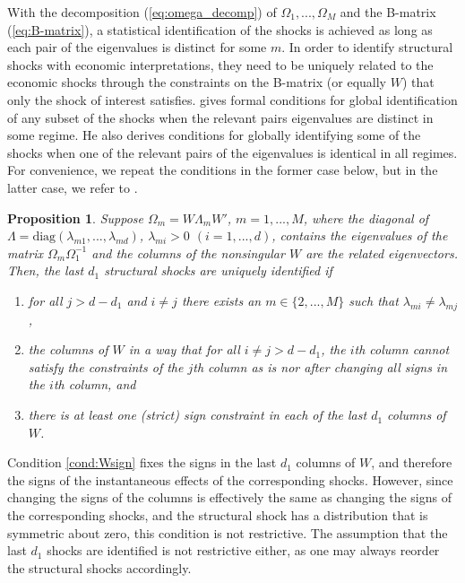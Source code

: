 \documentclass[nojss]{jss}
\newtheorem{proposition}{Proposition}
\begin{document}
With the decomposition (\ref{eq:omega_decomp}) of $\Omega_1,...,\Omega_M$ and the B-matrix (\ref{eq:B-matrix}),  a statistical identification of the shocks is achieved as long as each pair of the eigenvalues is distinct for some $m$.  In order to identify structural shocks with economic interpretations,  they need to be uniquely related to the economic shocks through the constraints on the B-matrix (or equally $W$) that only the shock of interest satisfies. \citet[Proposition 1]{Virolainen:2024} gives formal conditions for global identification of any subset of the shocks when the relevant pairs eigenvalues are distinct in some regime.  He also derives conditions for globally identifying some of the shocks when one of the relevant pairs of the eigenvalues is identical in all regimes.  For convenience,  we repeat the conditions in the former case below,  but in the latter case,  we refer to \citet[where also the following Proposition is proven]{Virolainen:2024}.
\begin{proposition}\label{prop:ident1}
Suppose $\Omega_m = W\Lambda_mW'$,  $m=1,...,M$, where the diagonal of $\Lambda = \text{diag}(\lambda_{m1},...,\lambda_{md})$,  $\lambda_{mi}>0$ $(i=1,...,d)$,  contains the eigenvalues of the matrix $\Omega_m\Omega_1^{-1}$ and the columns of the nonsingular $W$ are the related eigenvectors.  Then,  the last $d_1$ structural shocks are uniquely identified if
\begin{enumerate}
\item for all $j>d-d_1$ and $i \neq j$ there exists an $m\in\lbrace 2,...,M\rbrace$ such that $\lambda_{mi}\neq \lambda_{mj}$,\label{cond:lambdadif}
\item the columns of $W$ in a way that for all $i\neq j > d - d_1$, the $i$th column cannot satisfy the constraints of the $j$th column as is nor after changing all signs in the $i$th column, and\label{cond:Wconstraints}
\item there is at least one (strict) sign constraint in each of the last $d_1$ columns of $W$. \label{cond:Wsign}
\end{enumerate}
\end{proposition}
Condition \ref{cond:Wsign} fixes the signs in the last $d_1$ columns of $W$,  and therefore the signs of the instantaneous effects of the corresponding shocks.  However,  since changing the signs of the columns is effectively the same as changing the signs of the corresponding shocks, and the structural shock has a distribution that is symmetric about zero,  this condition is not restrictive.  The assumption that the last $d_1$ shocks are identified is not restrictive either,  as one may always reorder the structural shocks accordingly.
\end{document}
